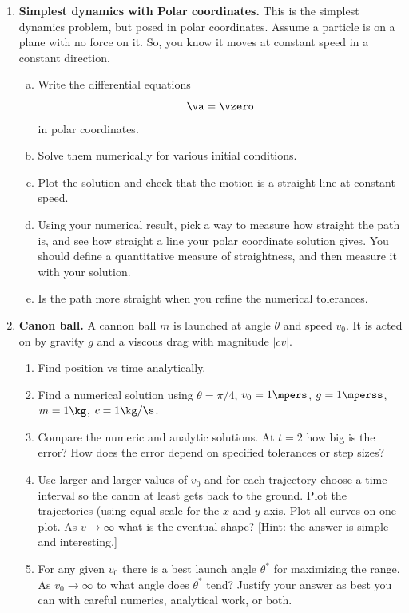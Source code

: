 \documentclass[11pt]{article}
\def\tight{ \setlength{\itemsep}{1.5pt}\setlength{\parskip}{0pt}\setlength{\parsep}{0pt}}
\begin{document}
\begin{enumerate}
\item{\bf Simplest dynamics with Polar coordinates.}  This is the simplest dynamics problem, but posed in polar coordinates.  Assume a particle is on a plane with no force on it.  So, you know it moves at constant speed in a constant direction.  


 \begin{enumerate}[a.] 
 \item Write the differential equations
\[
\va = \vzero
\]
 in polar coordinates.   
\item Solve them numerically for various initial conditions.
\item Plot the solution and check that the motion is a straight line at constant
 speed.  
\item Using your numerical result, pick a way to measure how straight the 
 path is, and see how straight a line your polar coordinate solution gives. You should define a quantitative measure of straightness, and then measure it with your solution.
\item  Is the path more straight when you refine the numerical tolerances.
\end{enumerate}


\item{\bf Canon ball.} \label{HWcanonball} A cannon ball $m$ is launched at angle $\theta$ and
speed $v_0$.  It is acted on by gravity $g$ and a viscous drag with magnitude
$|cv|$.    
\begin{enumerate}  \tight   
       \item Find position vs time analytically.
       \item Find a numerical solution using $\theta = \pi/4$,
           $v_0 = 1\mpers$, $g=1\mperss$, $m= 1 \kg$, $c = 1 \kg/\s$.  
        \item Compare the numeric and analytic solutions.  At $t=2$ how big
          is the error?  How does the error depend on specified tolerances or step sizes?
          \item  Use larger and larger values of $v_0$ and for each trajectory choose
          a time interval so the canon at least gets back to the ground. Plot the trajectories (using equal scale for the $x$ and $y$ axis.  Plot all curves on one plot.  As $v\rightarrow\infty$ what is the eventual shape? [Hint: the answer is simple
          and interesting.]
          
          \item For any given $v_0$ there is a best launch angle $\theta^*$ for
           maximizing the range.  As $v_0\rightarrow\infty$ to what angle does
           $\theta^*$ tend?  Justify your answer as best you can with careful numerics, analytical work, or both.
          

\end{enumerate}
\end{enumerate}
\end{document}
